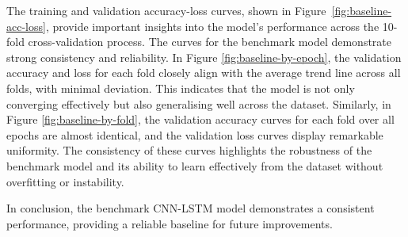 The training and validation accuracy-loss curves, shown in Figure~\ref{fig:baseline-acc-loss}, provide important insights into the model's performance across the 10-fold cross-validation process. The curves for the benchmark model demonstrate strong consistency and reliability. In Figure \ref{fig:baseline-by-epoch}, the validation accuracy and loss for each fold closely align with the average trend line across all folds, with minimal deviation. This indicates that the model is not only converging effectively but also generalising well across the dataset. Similarly, in Figure \ref{fig:baseline-by-fold}, the validation accuracy curves for each fold over all epochs are almost identical, and the validation loss curves display remarkable uniformity. The consistency of these curves highlights the robustness of the benchmark model and its ability to learn effectively from the dataset without overfitting or instability.

In conclusion, the benchmark CNN-LSTM model demonstrates a consistent performance, providing a reliable baseline for future improvements.